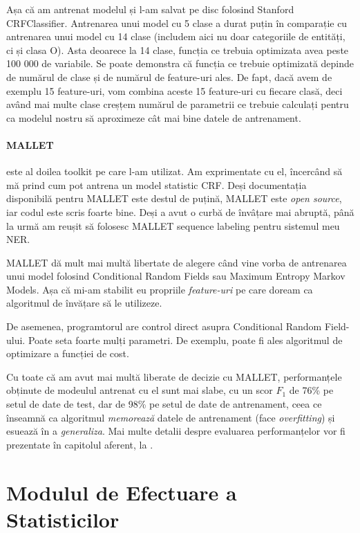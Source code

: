 Așa că am antrenat modelul și l-am salvat pe disc folosind Stanford CRFClassifier. Antrenarea unui model cu 5 clase a durat puțin în comparație cu antrenarea unui model cu 14 clase (includem aici nu doar categoriile de entități, ci și clasa O). Asta deoarece la 14 clase, funcția ce trebuia optimizata avea peste 100 000 de variabile. Se poate demonstra că funcția ce trebuie optimizată depinde de numărul de clase și de numărul de feature-uri ales. De fapt, dacă avem de exemplu 15 feature-uri, vom combina aceste 15 feature-uri  cu fiecare clasă, deci având mai multe clase creșțem numărul de parametrii ce trebuie calculați pentru ca modelul nostru să aproximeze cât mai bine datele de antrenament.

\paragraph{MALLET} este al doilea toolkit pe care l-am utilizat. Am exprimentate cu el, încercând să mă prind cum pot antrena un model statistic CRF. Deși documentația disponibilă pentru MALLET este destul de puțină, MALLET este \textit{open source}, iar codul este scris foarte bine. Deși a avut o curbă de învâțare mai abruptă, până la urmă am reușit să folosesc MALLET sequence labeling pentru sistemul meu NER. 

MALLET dă mult mai multă libertate de alegere când vine vorba de antrenarea unui model folosind Conditional Random Fields sau Maximum Entropy Markov Models. Așa că mi-am stabilit eu propriile \textit{feature-uri} pe care doream ca algoritmul de învățare să le utilizeze.

De asemenea, programtorul are control direct asupra Conditional Random Field-ului. Poate seta foarte mulți parametri. De exemplu, poate fi ales algoritmul de optimizare a funcției de cost.

Cu toate că am avut mai multă liberate de decizie cu MALLET, performanțele obținute de modeulul antrenat cu el sunt mai slabe, cu un scor $F_1$ de 76\% pe setul de date de test, dar de 98\% pe setul de date de antrenament, ceea ce înseamnă ca algoritmul \textit{memorează} datele de antrenament (face \textit{overfitting}) și esuează în a \textit{generaliza}. Mai multe detalii despre evaluarea performanțelor vor fi prezentate în capitolul aferent, la .


\section{Modulul de Efectuare a Statisticilor}

